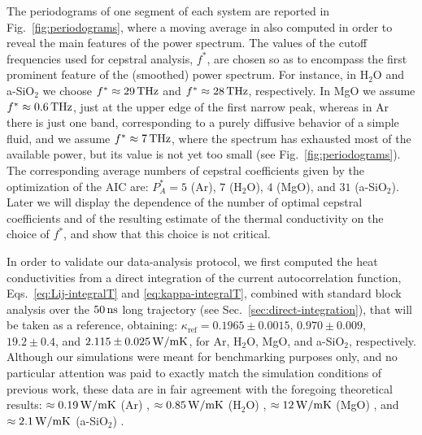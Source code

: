 The periodograms of one segment of each system are reported in Fig.~\ref{fig:periodograms}, where a moving average in also computed in order to reveal the main features of the power spectrum. 
The values of the cutoff frequencies used for cepstral analysis, $f^*$, are chosen so as to encompass the first prominent feature of the (smoothed) power spectrum. For instance, in H$_2$O and a-SiO$_2$ we choose $f^*\approx 29\,\mathrm{THz}$ and $f^*\approx 28\,\mathrm{THz}$, respectively. In MgO we assume $f^*\approx 0.6\,\mathrm{THz}$, just at the upper edge of the first narrow peak, whereas in Ar there is just one band, corresponding to a purely diffusive behavior of a simple fluid, and we assume $f^*\approx 7\,\mathrm{THz}$, where the spectrum has exhausted most of the available power, but its value is not yet too small (see Fig.~\ref{fig:periodograms}). The corresponding average numbers of cepstral coefficients given by the optimization of the AIC are: $P_A^*=5$ (Ar), $7$ (H$_2$O), $4$ (MgO), and $31$ (a-SiO$_2$). Later we will display the dependence of the number of optimal cepstral coefficients and of the resulting estimate of the thermal conductivity on the choice of $f^*$, and show that this choice is not critical.

In order to validate our data-analysis protocol, we first computed the heat conductivities from a direct integration of the current autocorrelation function, Eqs.~\eqref{eq:Lij-integralT} and \eqref{eq:kappa-integralT}, combined with standard block analysis over the $50\,\mathrm{ns}$ long trajectory (see Sec.~\ref{sec:direct-integration}), that will be taken as a reference, obtaining: $\kappa_{\mathrm{ref}} = 0.1965 \pm 0.0015$, $0.970 \pm 0.009$, $19.2 \pm 0.4$, and $2.115 \pm 0.025 \,\mathrm{W/mK}$, for Ar, H$_2$O, MgO, and a-SiO$_2$, respectively. 
Although our simulations were meant for benchmarking purposes only, and no particular attention was paid to exactly match the simulation conditions of previous work, these data are in fair agreement with the foregoing theoretical results: $\approx 0.19\,\mathrm{W/mK}$ (Ar) \cite{Argon-FF}, $\approx 0.85\,\mathrm{W/mK}$ (H$_2$O) \cite{Romer2012}, $\approx 12\,\mathrm{W/mK}$ (MgO) \cite{MgO-FF}, and $\approx 2.1\,\mathrm{W/mK}$ (a-SiO$_2$) \cite{Larkin2014}.

